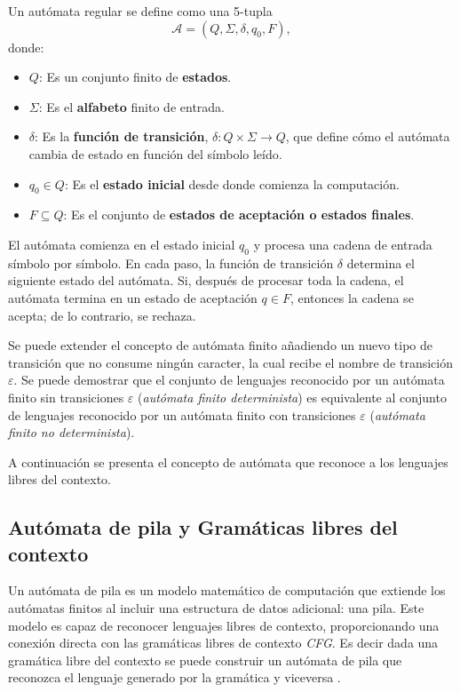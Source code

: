 Un autómata regular se define como una 5-tupla $$\mathcal{A} = (Q, \Sigma, \delta, q_0, F),$$ donde:

\begin{itemize}
      \item $Q$: Es un conjunto finito de \textbf{estados}.
      \item $\Sigma$: Es el \textbf{alfabeto} finito de entrada.
      \item $\delta$: Es la \textbf{función de transición}, $\delta: Q \times \Sigma \to Q$, que define cómo el autómata cambia de estado en función del símbolo leído.
      \item $q_0 \in Q$: Es el \textbf{estado inicial} desde donde comienza la computación.
      \item $F \subseteq Q$: Es el conjunto de \textbf{estados de aceptación o estados finales}.
\end{itemize}

El autómata comienza en el estado inicial $q_0$ y procesa una cadena de entrada símbolo por símbolo.
En cada paso, la función de transición $\delta$ determina el siguiente estado del autómata. Si, después de
procesar toda la cadena, el autómata termina en un estado de aceptación $q \in F$, entonces la cadena
se acepta; de lo contrario, se rechaza.

Se puede extender el concepto de autómata finito añadiendo un nuevo tipo de transición que no consume ningún 
caracter, la cual recibe el nombre de transición $\varepsilon$. Se puede demostrar \cite{authomataTheory} que
el conjunto de lenguajes reconocido por un autómata finito sin transiciones $\varepsilon$
(\textit{autómata finito determinista}) es equivalente al conjunto de lenguajes reconocido por un autómata finito con transiciones $\varepsilon$ (\textit{autómata finito no determinista}).

A continuación se presenta el concepto de autómata que reconoce a los lenguajes libres del contexto.
\subsection{Autómata de pila y Gramáticas libres del contexto}

Un autómata de pila \cite{authomataTheory} es un modelo matemático de computación que extiende los autómatas finitos al incluir una estructura de datos adicional: una pila. Este modelo es capaz de reconocer lenguajes libres de contexto,
proporcionando una conexión directa con las gramáticas libres de contexto \textit{CFG}. 
Es decir dada una gramática libre del contexto se puede construir un autómata de pila que reconozca el lenguaje 
generado por la gramática y viceversa \cite{authomataTheory}.

